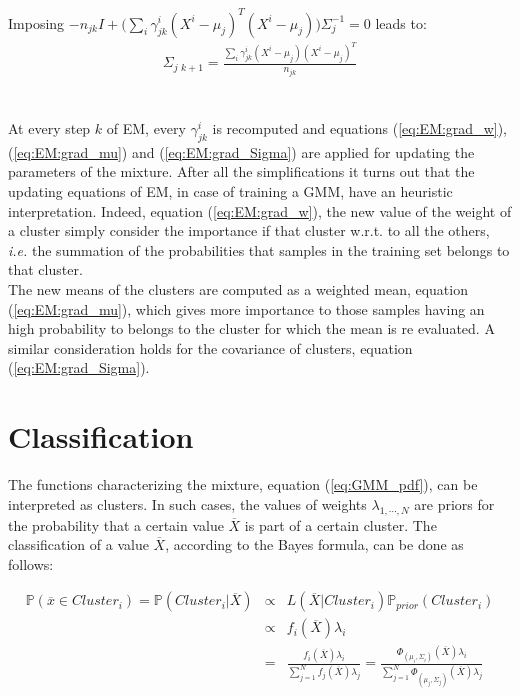\documentclass{article}
\begin{document}
Imposing $- n_{jk} I + \big(  \sum_i  \gamma^i_{jk} (X^i - \mu_j)^T(X^i - \mu_j) \big) \Sigma_j^{-1} = 0$ leads to:
\begin{eqnarray}
\Sigma _{j\,\,k+1} = \frac{\sum_{i} \gamma^{i}_{jk} (X^i - \mu_j)(X^i - \mu_j)^T}{n_{jk}}
\label{eq:EM:grad_Sigma}
\end{eqnarray}
\\
\\
At every step $k$ of EM, every $\gamma^i_{jk}$ is recomputed and equations (\ref{eq:EM:grad_w}), (\ref{eq:EM:grad_mu}) and (\ref{eq:EM:grad_Sigma}) are applied for updating the parameters of the mixture.
After all the simplifications it turns out that the updating equations of EM, in case of training a GMM, have an heuristic interpretation. Indeed, equation (\ref{eq:EM:grad_w}), the new value of the weight of a cluster simply consider the importance if that cluster w.r.t. to all the others, \textit{i.e.} the summation of the probabilities that samples in the training set belongs to that cluster.
\\
The new means of the clusters are computed as a weighted mean, equation (\ref{eq:EM:grad_mu}), which gives more importance to those samples having an high probability to belongs to the cluster for which the mean is re evaluated. A similar consideration holds for the covariance of clusters, equation (\ref{eq:EM:grad_Sigma}).

\section{Classification}
\label{sec:classify}

The functions characterizing the mixture, equation (\ref{eq:GMM_pdf}), can be interpreted as clusters. In such cases, the values of weights  $\lambda_{1,\cdots,N}$ are priors for the probability that a certain value $\overline{X}$ is part of a certain cluster.
The classification of a value $\overline{X}$, according to the Bayes formula, can be done as follows:

\begin{eqnarray}
 \mathbb{P}(\overline{x} \in Cluster_i) = \mathbb{P}(Cluster_i | \overline{X}) &\propto& 
L(\overline{X} | Cluster_i) \mathbb{P}_{prior}(Cluster_i) \nonumber\\
&\propto& f_i(\overline{X})\lambda_i \nonumber\\
&=& \frac{f_i(\overline{X})\lambda_i}{\sum_{j=1}^{N} f_j(\overline{X})\lambda_j} = \frac{\Phi_{(\mu_i, \Sigma_i)}(\overline{X})\lambda_i}{\sum_{j=1}^{N} \Phi_{(\mu_j, \Sigma_j)}(\overline{X})\lambda_j}
\end{eqnarray}
\end{document}
